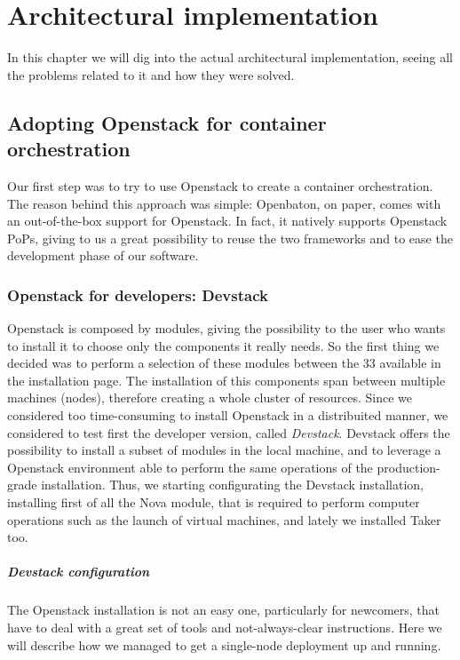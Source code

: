 \chapter{Architectural implementation}
\label{chap:archimpl}
 
In this chapter we will dig into the actual architectural implementation, 
seeing all the problems related to it and how they were solved.

\section{Adopting Openstack for container orchestration}

Our first step was to try to use Openstack to create a container orchestration. 
The reason behind this approach was simple: Openbaton, on paper, comes with an 
out-of-the-box support for Openstack. In fact, it natively supports Openstack 
PoPs, giving to us a great possibility to reuse the two frameworks and to ease 
the development phase of our software.
\subsection{Openstack for developers: Devstack}
Openstack is composed by modules, giving the possibility to the user who wants 
to install it to choose only the components it really needs. So the first thing 
we decided was to perform a selection of these modules between the 33 available 
in the installation page. The installation of this components span between 
multiple machines (nodes), therefore creating a whole cluster of resources. 
Since we considered too time-consuming to install Openstack in a distribuited 
manner, we considered to test first the developer version, called 
\emph{Devstack}. Devstack offers the possibility to install a subset of modules 
in the local machine, and to leverage a Openstack environment able to perform 
the same operations of the production-grade installation. Thus, we starting 
configurating the Devstack installation, installing first of all the Nova 
module, that is required to perform computer operations such as the launch of 
virtual machines, and lately we installed Taker too.

\paragraph*{Devstack configuration}
The Openstack installation is not an easy one, particularly for newcomers, that 
have to deal with a great set of tools and not-always-clear instructions. Here 
we will describe how we managed to get a single-node deployment up and running.


